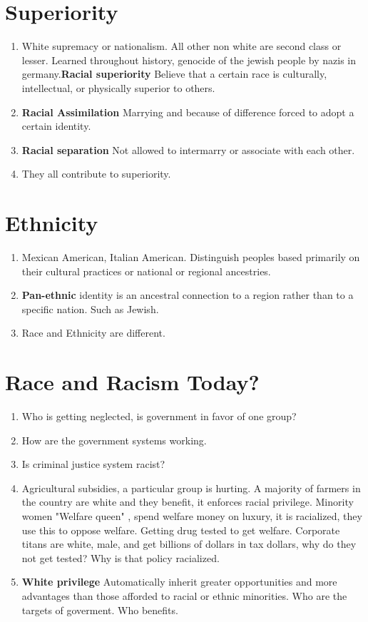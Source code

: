 \documentclass{article}
\begin{document}
\section*{Superiority}
\begin{enumerate}
    \item White supremacy or nationalism. All other non white are second class or lesser. Learned throughout history, genocide of the jewish people by nazis in germany.\textbf{Racial superiority} Believe that a certain race is culturally, intellectual, or physically superior to others. 
    \item \textbf{Racial Assimilation} Marrying and because of difference forced to adopt a certain identity. 
    \item \textbf{Racial separation} Not allowed to intermarry or associate with each other.
    \item They all contribute to superiority. 
\end{enumerate}
\section*{Ethnicity}
\begin{enumerate}
    \item Mexican American, Italian American. Distinguish peoples based primarily on their cultural practices or national or regional ancestries. 
    \item \textbf{Pan-ethnic} identity is an ancestral connection to a region rather than to a specific nation. Such as Jewish. 
    \item Race and Ethnicity are different. 
\end{enumerate}
\section*{Race and Racism Today?}
\begin{enumerate}
    \item Who is getting neglected, is government in favor of one group? 
    \item How are the government systems working. 
    \item Is criminal justice system racist? 
    \item Agricultural subsidies, a particular group is hurting. A majority of farmers in the country are  white and they benefit, it enforces racial privilege. Minority women "Welfare queen" , spend welfare money on luxury, it is racialized, they use this to oppose welfare. Getting drug tested to get welfare. Corporate titans are white, male, and get billions of dollars in tax dollars, why do they not get tested? Why is that policy racialized. 
    \item \textbf{White privilege} Automatically inherit greater opportunities and more advantages than those afforded to racial or ethnic minorities. Who are the targets of goverment. Who benefits. 
\end{enumerate}
\end{document}
